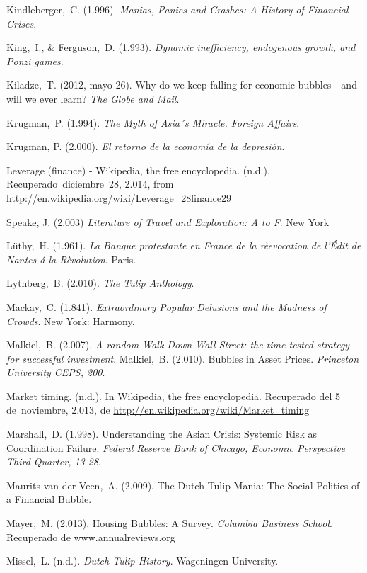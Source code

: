 \begin{thebibliography}{11}
	\bibitem{}
		Kindleberger, C. (1.996). \emph{Manias, Panics and Crashes: A History of Financial Crises}.  

	\bibitem{}
		King, I., \& Ferguson, D. (1.993). \emph{Dynamic inefficiency, endogenous growth, and Ponzi games}.  

	\bibitem{}
		Kiladze, T. (2012, mayo 26). Why do we keep falling for economic bubbles - and will we ever learn? \emph{The Globe and Mail}. 

	\bibitem{}
		Krugman, P. (1.994). \emph{The Myth of Asia´s Miracle. Foreign Affairs}. 

	\bibitem{}
		Krugman, P. (2.000). \emph{El retorno de la economía de la depresión}. 

	\bibitem{}
		Leverage (finance) - Wikipedia, the free encyclopedia. (n.d.). Recuperado diciembre 28, 2.014, from \url{http://en.wikipedia.org/wiki/Leverage\_28finance29}

	\bibitem{}
		 Speake, J. (2.003) \emph{Literature of Travel and Exploration: A to F}. New York

	\bibitem{}
		Lüthy, H. (1.961). \emph{La Banque protestante en France de la rèevocation de l’Édit de Nantes á la Rèvolution}. Paris. 	

	\bibitem{}
		Lythberg, B. (2.010). \emph{The Tulip Anthology}. 	

	\bibitem{}
		Mackay, C. (1.841). \emph{Extraordinary Popular Delusions and the Madness of Crowds}. New York: Harmony. 

	\bibitem{}
		Malkiel, B. (2.007). \emph{A random Walk Down Wall Street: the time tested strategy for successful investment}. 
	\bibitem{}
		Malkiel, B. (2.010). Bubbles in Asset Prices. \emph{Princeton University CEPS, 200}. 

	\bibitem{}
		Market timing. (n.d.). In Wikipedia, the free encyclopedia. Recuperado del 5 de noviembre, 2.013, de \url{http://en.wikipedia.org/wiki/Market\_timing}

	\bibitem{}
		Marshall, D. (1.998). Understanding the Asian Crisis: Systemic Risk as Coordination Failure. \emph{Federal Reserve Bank of Chicago, Economic Perspective Third Quarter, 13-28}. 

	\bibitem{}
		Maurits van der Veen, A. (2.009). The Dutch Tulip Mania: The Social Politics of a Financial Bubble. 	

	\bibitem{}
		Mayer, M. (2.013). Housing Bubbles: A Survey. \emph{Columbia Business School}. Recuperado de www.annualreviews.org

	\bibitem{}
		Missel, L. (n.d.). \emph{Dutch Tulip History}. Wageningen University. 	


\end{thebibliography}
